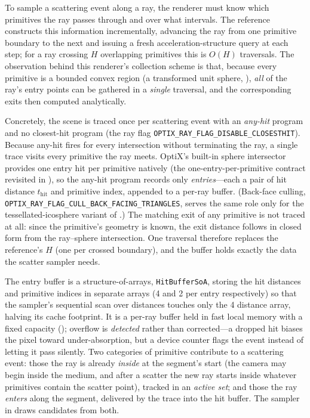 To sample a scattering event along a ray, the renderer must know which primitives the ray passes
through and over what intervals. The reference constructs this information incrementally, advancing the
ray from one primitive boundary to the next and issuing a fresh acceleration-structure query at each
step; for a ray crossing $H$ overlapping primitives this is $O(H)$ traversals. The observation behind
this renderer's collection scheme is that, because every primitive is a bounded convex region (a
transformed unit sphere, ), \emph{all} of the ray's entry points can be gathered in
a \emph{single} traversal, and the corresponding exits then computed analytically.

Concretely, the scene is traced once per scattering event with an \emph{any-hit} program and no
closest-hit program (the ray flag \texttt{OPTIX\_\allowbreak RAY\_\allowbreak FLAG\_\allowbreak DISABLE\_\allowbreak CLOSESTHIT}). Because any-hit
fires for every intersection without terminating the ray, a single trace visits every primitive the
ray meets. OptiX's built-in sphere intersector provides one entry hit per primitive natively (the
one-entry-per-primitive contract revisited in ), so the any-hit program records
only \emph{entries}---each a pair of hit distance $t_{\text{hit}}$ and primitive index, appended to a
per-ray buffer. (Back-face culling, \texttt{OPTIX\_\allowbreak RAY\_\allowbreak FLAG\_\allowbreak CULL\_\allowbreak BACK\_\allowbreak FACING\_\allowbreak TRIANGLES}, serves
the same role only for the tessellated-icosphere variant of .) The matching exit of
any primitive is not traced at all: since the primitive's geometry is known, the exit distance follows
in closed form from the ray--sphere intersection. One traversal therefore replaces the reference's
$H$ (one per crossed boundary), and the buffer holds exactly the data the scatter sampler needs.

The entry buffer is a structure-of-arrays, \texttt{HitBufferSoA}, storing the hit distances and
primitive indices in separate arrays (\SI{4}{\byte} and \SI{2}{\byte} per entry respectively) so that
the sampler's sequential scan over distances touches only the \SI{4}{\byte} distance array, halving its
cache footprint. It is a per-ray buffer held in fast local memory
with a fixed capacity (); overflow is \emph{detected} rather than corrected---a
dropped hit biases the pixel toward under-absorption, but a device counter flags the event instead of
letting it pass silently. Two categories of primitive contribute to a scattering event: those the ray is
already \emph{inside} at the segment's start (the camera may begin inside the medium, and after a
scatter the new ray starts inside whatever primitives contain the scatter point), tracked in an
\emph{active set}; and those the ray \emph{enters} along the segment, delivered by the trace into the
hit buffer. The sampler in  draws candidates from both.

